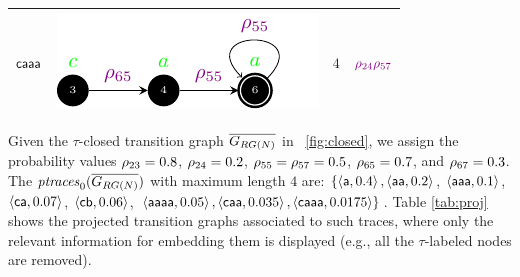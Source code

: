 {{\begin{table}[!t]
{\begin{tabular}{>{\centering\arraybackslash} m{1cm}| >{\centering\arraybackslash} m{4cm} >{\centering\arraybackslash} m{1cm} >{\centering\arraybackslash} m{1cm} }
	$\mathsf{caaa}$ & \includegraphics{images/trace_ca_loop} & $4$ & $\color{violet}\rho_{24}\rho_{57}$\\
	\bottomrule
\end{tabular}}
\vspace{-0.2cm}
\end{table}
\begin{example}\label{ex:neue}
Given the $\tau$-closed transition graph $\overline{G_{RG(N)}}$ in \figurename~\ref{fig:closed}, we assign the probability values
$\rho_{23}=0.8$, $\rho_{24}=0.2$, $\rho_{55}=\rho_{57}=0.5$, $\rho_{65}=0.7$, and $\rho_{67}=0.3$. The $\mathit{ptraces}_{0}(\overline{G_{RG(N)}})$ with maximum length $4$ are:
$\{\braket{\mathsf{a},0.4},\braket{\mathsf{aa},0.2}$, $\braket{\mathsf{aaa},0.1}$, $\braket{\mathsf{ca},0.07}$, $\braket{\mathsf{cb},0.06}$,
$\braket{\mathsf{aaaa},0.05},\braket{\mathsf{caa},0.035},\braket{\mathsf{caaa},0.0175}\}$.
Table \ref{tab:proj} shows the projected transition graphs associated to such traces, where only the relevant information
for embedding them is displayed (e.g., all the $\tau$-labeled nodes are removed).
\end{example}
	
}}
